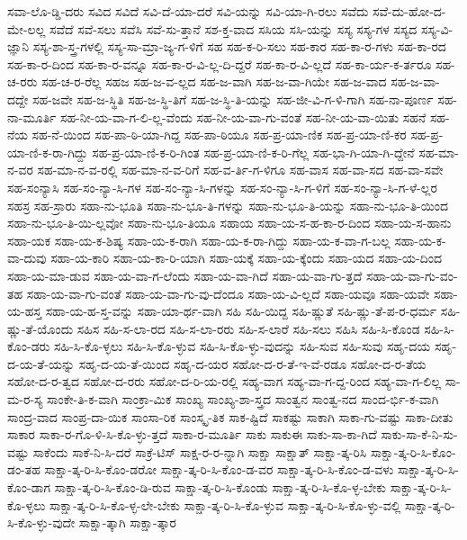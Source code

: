 {ಸವಾ-ಲೊ-ಡ್ಡಿ-ದರು
ಸವಿದ
ಸವಿದೆ
ಸವಿ-ದೆ-ಯಾ-ದರೆ
ಸವಿ-ಯನ್ನು
ಸವಿ-ಯಾ-ಗಿ-ರಲು
ಸವೆದು
ಸವೆ-ದು-ಹೋ-ದ-ಮೇ-ಲಲ್ಲ
ಸವೆದೆ
ಸವೆ-ಸಲು
ಸವೆಸಿ
ಸವೆ-ಸು-ತ್ತಾನೆ
ಸಶ-ಕ್ತ-ವಾದ
ಸಸಿಯ
ಸಸಿ-ಯನ್ನು
ಸಸ್ಯ
ಸಸ್ಯ-ಗಳ
ಸಸ್ಯದ
ಸಸ್ಯ-ವಿ-ಜ್ಞಾನಿ
ಸಸ್ಯ-ಶಾ-ಸ್ತ್ರ-ಗಳಲ್ಲಿ
ಸಸ್ಯ-ಸಾ-ಮ್ರಾ-ಜ್ಯ-ಗ-ಳಿಗೆ
ಸಹ
ಸಹ-ಕ-ರಿ-ಸಲು
ಸಹ-ಕಾರ
ಸಹ-ಕಾ-ರ-ಗಳು
ಸಹ-ಕಾ-ರದ
ಸಹ-ಕಾ-ರ-ದಿಂದ
ಸಹ-ಕಾ-ರ-ವನ್ನೂ
ಸಹ-ಕಾ-ರ-ವಿ-ಲ್ಲ-ದಿ-ದ್ದರೆ
ಸಹ-ಕಾ-ರ-ವಿ-ಲ್ಲದೆ
ಸಹ-ಕಾ-ರ್ಯ-ಕ-ರ್ತರೂ
ಸಹ-ಚ-ರರು
ಸಹ-ಚ-ರ-ರೆಲ್ಲ
ಸಹಜ
ಸಹ-ಜ-ವ-ಲ್ಲದ
ಸಹ-ಜ-ವಾಗಿ
ಸಹ-ಜ-ವಾ-ಗಿಯೇ
ಸಹ-ಜ-ವಾದ
ಸಹ-ಜ-ವಾ-ದದ್ದೇ
ಸಹ-ಜವೇ
ಸಹ-ಜ-ಸ್ಥಿತಿ
ಸಹ-ಜ-ಸ್ಥಿ-ತಿಗೆ
ಸಹ-ಜ-ಸ್ಥಿ-ತಿ-ಯನ್ನು
ಸಹ-ಜೀ-ವಿ-ಗ-ಳಿ-ಗಾಗಿ
ಸಹ-ನಾ-ಪೂರ್ಣ
ಸಹ-ನಾ-ಮೂರ್ತಿ
ಸಹ-ನೀ-ಯ-ವಾ-ಗ-ಲಿ-ಲ್ಲ-ವೆಂದು
ಸಹ-ನೀ-ಯ-ವಾ-ಗು-ವಂತೆ
ಸಹ-ನೀ-ಯ-ವಾ-ಯಿತು
ಸಹನೆ
ಸಹ-ನೆಯ
ಸಹ-ನೆ-ಯಿಂದ
ಸಹ-ಪಾ-ಠಿ-ಯಾ-ಗಿದ್ದ
ಸಹ-ಪಾ-ಠಿಯೂ
ಸಹ-ಪ್ರ-ಯಾ-ಣಿಕ
ಸಹ-ಪ್ರ-ಯಾ-ಣಿ-ಕರ
ಸಹ-ಪ್ರ-ಯಾ-ಣಿ-ಕ-ರಾ-ಗಿದ್ದು
ಸಹ-ಪ್ರ-ಯಾ-ಣಿ-ಕ-ರಿ-ಗಿಂತ
ಸಹ-ಪ್ರ-ಯಾ-ಣಿ-ಕ-ರಿ-ಗೆಲ್ಲ
ಸಹ-ಭಾ-ಗಿ-ಯಾ-ಗಿ-ದ್ದೇನೆ
ಸಹ-ಮಾ-ನ-ವರ
ಸಹ-ಮಾ-ನ-ವ-ರಲ್ಲಿ
ಸಹ-ಮಾ-ನ-ವ-ರಿಗೆ
ಸಹ-ವ-ರ್ತಿ-ಗ-ಳಿಗೂ
ಸಹ-ವಾಸ
ಸಹ-ವಾ-ಸದ
ಸಹ-ವಾ-ಸವೇ
ಸಹ-ಸಂನ್ಯಾಸಿ
ಸಹ-ಸಂ-ನ್ಯಾ-ಸಿ-ಗಳ
ಸಹ-ಸಂ-ನ್ಯಾ-ಸಿ-ಗಳನ್ನು
ಸಹ-ಸಂ-ನ್ಯಾ-ಸಿ-ಗ-ಳಿಗೆ
ಸಹ-ಸಂ-ನ್ಯಾ-ಸಿ-ಗ-ಳೆ-ಲ್ಲರ
ಸಹಸ್ರ
ಸಹ-ಸ್ರಾರು
ಸಹಾ-ನು-ಭೂತಿ
ಸಹಾ-ನು-ಭೂ-ತಿ-ಗಳನ್ನು
ಸಹಾ-ನು-ಭೂ-ತಿ-ಯನ್ನು
ಸಹಾ-ನು-ಭೂ-ತಿ-ಯಿಂದ
ಸಹಾ-ನು-ಭೂ-ತಿ-ಯಿ-ಲ್ಲವೋ
ಸಹಾ-ನು-ಭೂ-ತಿಯೂ
ಸಹಾಯ
ಸಹಾ-ಯ-ಸ-ಹ-ಕಾ-ರ-ದಿಂದ
ಸಹಾ-ಯ-ಸ-ಹಾನು
ಸಹಾ-ಯಕ
ಸಹಾ-ಯ-ಕ-ಶಿಷ್ಯ
ಸಹಾ-ಯ-ಕ-ರಾಗಿ
ಸಹಾ-ಯ-ಕ-ರಾ-ಗಿದ್ದು
ಸಹಾ-ಯ-ಕ-ವಾ-ಗ-ಬಲ್ಲ
ಸಹಾ-ಯ-ಕ-ವಾ-ದುವು
ಸಹಾ-ಯ-ಕಾರಿ
ಸಹಾ-ಯ-ಕಾ-ರಿ-ಯಾಗಿ
ಸಹಾ-ಯಕ್ಕೆ
ಸಹಾ-ಯ-ಕ್ಕೆಂದು
ಸಹಾ-ಯದ
ಸಹಾ-ಯ-ದಿಂದ
ಸಹಾ-ಯ-ಮಾ-ಡುವ
ಸಹಾ-ಯ-ವಾ-ಗ-ಲೆಂದು
ಸಹಾ-ಯ-ವಾ-ಗಿದೆ
ಸಹಾ-ಯ-ವಾ-ಗು-ತ್ತದೆ
ಸಹಾ-ಯ-ವಾ-ಗು-ವಂ-ತಹ
ಸಹಾ-ಯ-ವಾ-ಗು-ವಂತೆ
ಸಹಾ-ಯ-ವಾ-ಗು-ವು-ದೆಂದೂ
ಸಹಾ-ಯ-ವಿ-ಲ್ಲದೆ
ಸಹಾ-ಯವೂ
ಸಹಾ-ಯವೇ
ಸಹಾ-ಯ-ಹಸ್ತ
ಸಹಾ-ಯ-ಹ-ಸ್ತ-ವನ್ನು
ಸಹಾ-ಯಾ-ರ್ಥ-ವಾಗಿ
ಸಹಿ
ಸಹಿ-ಯಿದ್ದ
ಸಹಿ-ಷ್ಣುತೆ
ಸಹಿ-ಷ್ಣು-ತೆ-ಪ-ರ-ಧರ್ಮ
ಸಹಿ-ಷ್ಣು-ತೆ-ಯೊಂದು
ಸಹಿಸ
ಸಹಿ-ಸ-ಲಾ-ರದ
ಸಹಿ-ಸ-ಲಾ-ರರು
ಸಹಿ-ಸ-ಲಾರೆ
ಸಹಿ-ಸಲು
ಸಹಿಸಿ
ಸಹಿ-ಸಿ-ಕೊಂಡ
ಸಹಿ-ಸಿ-ಕೊಂ-ಡರು
ಸಹಿ-ಸಿ-ಕೊ-ಳ್ಳಲು
ಸಹಿ-ಸಿ-ಕೊ-ಳ್ಳುವ
ಸಹಿ-ಸಿ-ಕೊ-ಳ್ಳು-ವುದನ್ನು
ಸಹಿ-ಸುವ
ಸಹಿ-ಸುವು
ಸಹೃ-ದಯ
ಸಹೃ-ದ-ಯ-ತೆ-ಯನ್ನು
ಸಹೃ-ದ-ಯ-ತೆ-ಯಿಂದ
ಸಹೃ-ದ-ಯರ
ಸಹೋ-ದ-ರ-ತೆ-ಇ-ವೆ-ರಡೂ
ಸಹೋ-ದ-ರ-ತೆಯ
ಸಹೋ-ದ-ರ-ತ್ವದ
ಸಹೋ-ದ-ರರು
ಸಹೋ-ದ-ರಿ-ಯ-ರಲ್ಲಿ
ಸಹ್ಯ-ವಾಗ
ಸಹ್ಯ-ವಾ-ಗ-ದ್ದ-ರಿಂದ
ಸಹ್ಯ-ವಾ-ಗ-ಲಿಲ್ಲ
ಸಾ-ಮ-ರ-ಸ್ಯ
ಸಾಂಕೇ-ತಿ-ಕ-ವಾಗಿ
ಸಾಂಕ್ರಾ-ಮಿಕ
ಸಾಂಖ್ಯ
ಸಾಂಖ್ಯ-ಶಾ-ಸ್ತ್ರದ
ಸಾಂತ್ವನ
ಸಾಂತ್ವ-ನದ
ಸಾಂದ-ರ್ಭಿ-ಕ-ವಾಗಿ
ಸಾಂದ್ರ-ವಾದ
ಸಾಂಪ್ರ-ದಾ-ಯಿಕ
ಸಾಂಸಾ-ರಿಕ
ಸಾಂಸ್ಕೃ-ತಿಕ
ಸಾಕ-ಷ್ಟಿದೆ
ಸಾಕಷ್ಟು
ಸಾಕಾಗಿ
ಸಾಕಾ-ಗು-ವಷ್ಟು
ಸಾಕಾ-ದೀತು
ಸಾಕಾರ
ಸಾಕಾ-ರ-ಗೊ-ಳಿ-ಸಿ-ಕೊ-ಳ್ಳು-ತ್ತದೆ
ಸಾಕಾ-ರ-ಮೂರ್ತಿ
ಸಾಕು
ಸಾಕುಈ
ಸಾಕು-ಸಾ-ಕಾ-ಗಿದೆ
ಸಾಕು-ಸಾ-ಕೆ-ನಿ-ಸು-ವಷ್ಟು
ಸಾಕೆಂದು
ಸಾಕೆ-ನಿ-ಸಿ-ದರೆ
ಸಾಕ್ರೆ-ಟಿಸ್
ಸಾಕ್ಷ-ರ-ರ-ನ್ನಾಗಿ
ಸಾಕ್ಷಾ
ಸಾಕ್ಷಾತ್
ಸಾಕ್ಷಾ-ತ್ಕ-ರಿಸಿ
ಸಾಕ್ಷಾ-ತ್ಕ-ರಿ-ಸಿ-ಕೊಂ-ಡಂ-ತಹ
ಸಾಕ್ಷಾ-ತ್ಕ-ರಿ-ಸಿ-ಕೊಂ-ಡರೋ
ಸಾಕ್ಷಾ-ತ್ಕ-ರಿ-ಸಿ-ಕೊಂ-ಡ-ವರ
ಸಾಕ್ಷಾ-ತ್ಕ-ರಿ-ಸಿ-ಕೊಂ-ಡ-ವಳು
ಸಾಕ್ಷಾ-ತ್ಕ-ರಿ-ಸಿ-ಕೊಂ-ಡಾಗ
ಸಾಕ್ಷಾ-ತ್ಕ-ರಿ-ಸಿ-ಕೊಂ-ಡಿ-ರುವ
ಸಾಕ್ಷಾ-ತ್ಕ-ರಿ-ಸಿ-ಕೊಂಡು
ಸಾಕ್ಷಾ-ತ್ಕ-ರಿ-ಸಿ-ಕೊ-ಳ್ಳ-ಬೇಕು
ಸಾಕ್ಷಾ-ತ್ಕ-ರಿ-ಸಿ-ಕೊ-ಳ್ಳಲು
ಸಾಕ್ಷಾ-ತ್ಕ-ರಿ-ಸಿ-ಕೊ-ಳ್ಳ-ಲೇ-ಬೇಕು
ಸಾಕ್ಷಾ-ತ್ಕ-ರಿ-ಸಿ-ಕೊ-ಳ್ಳುವ
ಸಾಕ್ಷಾ-ತ್ಕ-ರಿ-ಸಿ-ಕೊ-ಳ್ಳು-ವಲ್ಲಿ
ಸಾಕ್ಷಾ-ತ್ಕ-ರಿ-ಸಿ-ಕೊ-ಳ್ಳು-ವುದೇ
ಸಾಕ್ಷಾ-ತ್ಕಾಗಿ
ಸಾಕ್ಷಾ-ತ್ಕಾರ
}

